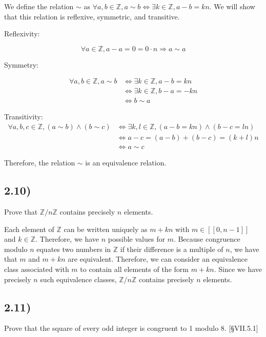\documentclass[12pt, letterpaper, twoside]{report}
\begin{document}
We define the relation $\sim$ as $\forall a, b \in \mathbb{Z}, a \sim b \Leftrightarrow \exists k \in \mathbb{Z}, a - b = kn$. We will show that this relation is reflexive, symmetric, and transitive.

Reflexivity: 

$$\forall a \in \mathbb{Z}, a - a = 0 = 0 \cdot n \Rightarrow a \sim a$$

Symmetry:

$$
\begin{aligned}
\forall a, b \in \mathbb{Z}, a \sim b
&\Leftrightarrow \exists k \in \mathbb{Z}, a - b = kn \\
&\Leftrightarrow \exists k \in \mathbb{Z}, b - a = -kn \\
&\Leftrightarrow b \sim a
\end{aligned}
$$


Transitivity:
$$
\begin{aligned}
\forall a, b, c \in \mathbb{Z}, (a \sim b) \land (b \sim c)
&\Leftrightarrow \exists k, l \in \mathbb{Z}, (a - b = kn) \land (b - c = ln) \\
&\Leftrightarrow a - c = (a - b) + (b - c) = (k + l)n \\
&\Leftrightarrow a \sim c
\end{aligned}
$$

Therefore, the relation $\sim$ is an equivalence relation.


\subsection*{2.10)}

Prove that $\mathbb{Z}/n\mathbb{Z}$ contains precisely $n$ elements.

Each element of $\mathbb{Z}$ can be written uniquely as $m + kn$ with $m \in [[0, n-1]]$ and $k \in \mathbb{Z}$. Therefore, we have $n$ possible values for $m$. Because congruence modulo $n$ equates two numbers in $\mathbb{Z}$ if their difference is a multiple of $n$, we have that $m$ and $m + kn$ are equivalent. Therefore, we can consider an equivalence class associated with $m$ to contain all elements of the form $m + kn$. Since we have precisely $n$ such equivalence classes, $\mathbb{Z}/n\mathbb{Z}$ contains precisely $n$ elements.


\subsection*{2.11)}

Prove that the square of every odd integer is congruent to 1 modulo 8. [§VII.5.1]
\end{document}
